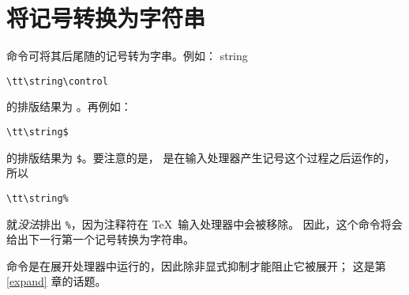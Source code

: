 \documentclass{book}
\begin{document}
\section{将记号转换为字符串}

 命令可将其后尾随的记号转为字串。例如：
\cstoidx string\par
\begin{verbatim}
\tt\string\control
\end{verbatim}
的排版结果为 。再例如：
\begin{verbatim}
\tt\string$
\end{verbatim}
的排版结果为 \verb-$-。要注意的是，
 是在输入处理器产生记号这个过程之后运作的，所以
\begin{verbatim}
\tt\string%
\end{verbatim}
就\emph{没法}排出 \verb-%-，因为注释符在 \TeX\ 输入处理器中会被移除。
因此，这个命令将会给出下一行第一个记号转换为字符串。

 命令是在展开处理器中运行的，因此除非显式抑制才能阻止它被展开；
这是第 \ref{expand} 章的话题。

\end{document}
